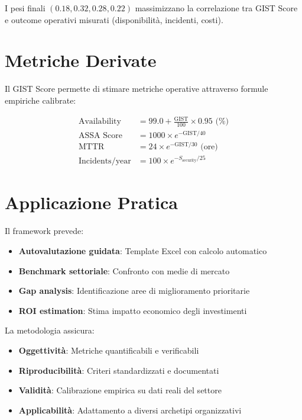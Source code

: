 I pesi finali $(0.18, 0.32, 0.28, 0.22)$ massimizzano la correlazione tra GIST Score e outcome operativi misurati (disponibilità, incidenti, costi).

\section{Metriche Derivate}

Il GIST Score permette di stimare metriche operative attraverso formule empiriche calibrate:

\begin{align}
\text{Availability} &= 99.0 + \frac{\text{GIST}}{100} \times 0.95 \text{ (\%)} \\
\text{ASSA Score} &= 1000 \times e^{-\text{GIST}/40} \\
\text{MTTR} &= 24 \times e^{-\text{GIST}/30} \text{ (ore)} \\
\text{Incidents/year} &= 100 \times e^{-S_{\text{security}}/25}
\end{align}

\section{Applicazione Pratica}

Il framework prevede:

\begin{itemize}
    \item \textbf{Autovalutazione guidata}: Template Excel con calcolo automatico
    \item \textbf{Benchmark settoriale}: Confronto con medie di mercato
    \item \textbf{Gap analysis}: Identificazione aree di miglioramento prioritarie
    \item \textbf{ROI estimation}: Stima impatto economico degli investimenti
\end{itemize}

La metodologia assicura:
\begin{itemize}
    \item \textbf{Oggettività}: Metriche quantificabili e verificabili
    \item \textbf{Riproducibilità}: Criteri standardizzati e documentati
    \item \textbf{Validità}: Calibrazione empirica su dati reali del settore
    \item \textbf{Applicabilità}: Adattamento a diversi archetipi organizzativi
\end{itemize}